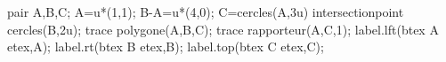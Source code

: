 
\begin{Geometrie}
    pair A,B,C;
    A=u*(1,1);
    B-A=u*(4,0);
    C=cercles(A,3u) intersectionpoint cercles(B,2u);
    trace polygone(A,B,C);
    trace rapporteur(A,C,1);
    label.lft(btex A etex,A);
    label.rt(btex B etex,B);
    label.top(btex C etex,C);
\end{Geometrie}